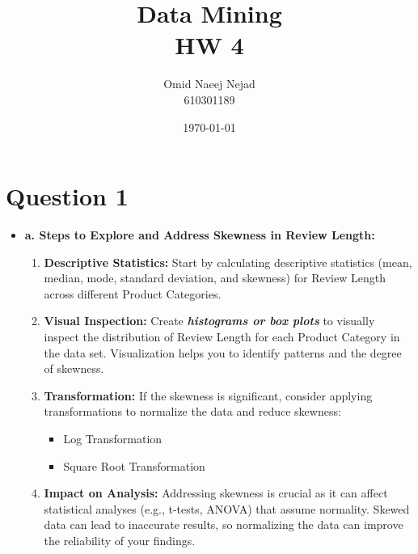 \documentclass[12pt]{article}
\title{Data Mining \\ HW 4}
\date{\today}
\author{Omid Naeej Nejad \\ 610301189}
\begin{document}
	\maketitle
	\section{Question 1}	
		\begin{itemize}
			\item \textbf{a. Steps to Explore and Address Skewness in Review Length:}
			\begin{enumerate}
				\item \textbf{Descriptive Statistics:} 
				Start by calculating descriptive statistics (mean, median, mode, standard deviation, and skewness) for Review Length across different Product Categories.
			
				\item \textbf{Visual Inspection:} 
				Create \emph{\textbf{histograms or box plots}} to visually inspect the distribution of Review Length for each Product Category in the data set. Visualization helps you to identify patterns and the degree of skewness.
			
				\item \textbf{Transformation:}
				If the skewness is significant, consider applying transformations to normalize the data and reduce skewness:
				\begin{itemize}
					\item Log Transformation			
					\item Square Root Transformation
				\end{itemize}



				\item \textbf{Impact on Analysis:} Addressing skewness is crucial as it can affect statistical analyses (e.g., t-tests, ANOVA) that assume normality. Skewed data can lead to inaccurate results, so normalizing the data can improve the reliability of your findings.		
		\end{enumerate}
			

\end{itemize}
\end{document}

